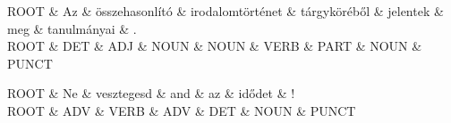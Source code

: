 \documentclass{article}
\begin{document}
\hspace{-4cm}
\begin{dependency}
\begin{deptext}
ROOT \& Az \& összehasonlító \& irodalomtörténet \& tárgyköréből \& jelentek \& meg \& tanulmányai \& . \\
ROOT \& DET \& ADJ \& NOUN \& NOUN \& VERB \& PART \& NOUN \& PUNCT \\
\end{deptext}
\end{dependency}


\hspace{-4cm}
\begin{dependency}
\begin{deptext}
ROOT \& Ne \& vesztegesd \& and \& az \& idődet \& ! \\
ROOT \& ADV \& VERB \& ADV \& DET \& NOUN \& PUNCT \\
\end{deptext}
\end{dependency}
\end{document}
